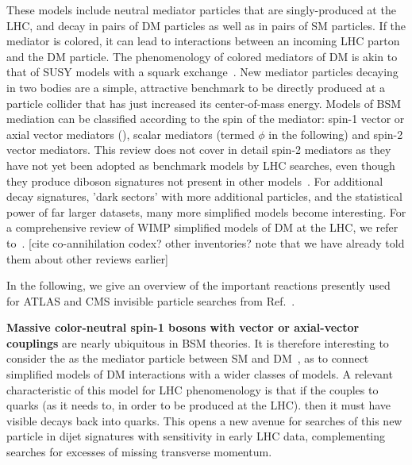 These models include neutral mediator particles that are singly-produced at the LHC, and decay in pairs of DM particles as well as in pairs of SM particles. If the mediator is colored, it can lead to interactions between an incoming LHC parton and the DM particle. The phenomenology of colored mediators of DM is akin to that of SUSY models with a squark exchange~\cite{Papucci:2014iwa,An:2013xka,Bell:2012rg}. New mediator particles decaying in two bodies
are a simple, attractive benchmark to be directly produced at a particle collider that has just increased its center-of-mass energy. Models of BSM mediation can be classified according to the spin of the mediator: spin-1 vector or axial vector mediators (\Zprime), scalar mediators (termed $\phi$ in the following) and spin-2 vector mediators. This review does not cover in detail spin-2 mediators as they have not yet been adopted as benchmark models by LHC searches, even though they produce diboson signatures not present in other models~\cite{Kraml:2017atm,Han:2015cty}. For additional decay signatures, 'dark sectors' with more additional particles, and the statistical power of far larger datasets, many more simplified models become interesting. For a comprehensive review of WIMP simplified models of DM at the LHC, we refer to~\cite{Arcadi:2017kky}. [cite co-annihilation codex? other inventories? note that we have already told them about other reviews earlier]

In the following, we give an overview of the important reactions presently used for ATLAS and CMS invisible particle searches from Ref.~\cite{Abercrombie:2015wmb}.

\textbf{Massive color-neutral spin-1 bosons with vector or axial-vector couplings} are nearly ubiquitous in BSM theories. 
It is therefore interesting to consider the \Zprime as the mediator particle between SM and DM~\cite{Shoemaker:2011vi},
as to connect simplified models of DM interactions with a wider classes of models.
A relevant characteristic of this model for LHC phenomenology is that if the \Zprime couples to quarks (as it needs to, in order to be produced at the LHC). 
then it must have visible decays back into quarks. This opens a new avenue for searches of this new
particle in dijet signatures with sensitivity in early LHC data, complementing searches for excesses
of missing transverse momentum. 

